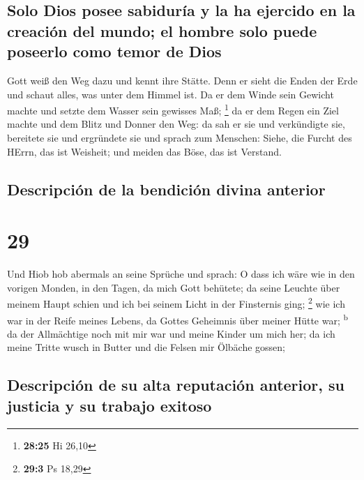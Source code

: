 \hypertarget{solo-dios-posee-sabiduruxeda-y-la-ha-ejercido-en-la-creaciuxf3n-del-mundo-el-hombre-solo-puede-poseerlo-como-temor-de-dios}{%
\subsection{Solo Dios posee sabiduría y la ha ejercido en la creación
del mundo; el hombre solo puede poseerlo como temor de
Dios}\label{solo-dios-posee-sabiduruxeda-y-la-ha-ejercido-en-la-creaciuxf3n-del-mundo-el-hombre-solo-puede-poseerlo-como-temor-de-dios}}

 Gott weiß den Weg dazu und kennt ihre Stätte.
 Denn er sieht die Enden der Erde und schaut alles, was
unter dem Himmel ist.  Da er dem Winde sein Gewicht
machte und setzte dem Wasser sein gewisses Maß; \footnote{\textbf{28:25}
  Hi 26,10}  da er dem Regen ein Ziel machte und dem
Blitz und Donner den Weg:  da sah er sie und verkündigte
sie, bereitete sie und ergründete sie  und sprach zum
Menschen: Siehe, die Furcht des HErrn, das ist Weisheit; und meiden das
Böse, das ist Verstand.

\hypertarget{descripciuxf3n-de-la-bendiciuxf3n-divina-anterior}{%
\subsection{Descripción de la bendición divina
anterior}\label{descripciuxf3n-de-la-bendiciuxf3n-divina-anterior}}

\hypertarget{section-28}{%
\section{29}\label{section-28}}

 Und Hiob hob abermals an seine Sprüche und sprach:
 O dass ich wäre wie in den vorigen Monden, in den Tagen,
da mich Gott behütete;  da seine Leuchte über meinem Haupt
schien und ich bei seinem Licht in der Finsternis ging; \footnote{\textbf{29:3}
  Ps 18,29}  wie ich war in der Reife meines Lebens, da
Gottes Geheimnis über meiner Hütte war; \textsuperscript{b}
 da der Allmächtige noch mit mir war und meine Kinder um
mich her;  da ich meine Tritte wusch in Butter und die
Felsen mir Ölbäche gossen;

\hypertarget{descripciuxf3n-de-su-alta-reputaciuxf3n-anterior-su-justicia-y-su-trabajo-exitoso}{%
\subsection{Descripción de su alta reputación anterior, su justicia y su
trabajo
exitoso}\label{descripciuxf3n-de-su-alta-reputaciuxf3n-anterior-su-justicia-y-su-trabajo-exitoso}}


